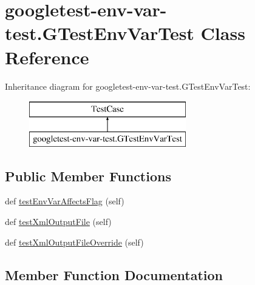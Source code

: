 \hypertarget{classgoogletest-env-var-test_1_1_g_test_env_var_test}{}\section{googletest-\/env-\/var-\/test.G\+Test\+Env\+Var\+Test Class Reference}
\label{classgoogletest-env-var-test_1_1_g_test_env_var_test}
Inheritance diagram for googletest-\/env-\/var-\/test.G\+Test\+Env\+Var\+Test\+:\begin{figure}[H]
\begin{center}
\leavevmode
\includegraphics[height=2.000000cm]{df/de5/classgoogletest-env-var-test_1_1_g_test_env_var_test}
\end{center}
\end{figure}
\subsection*{Public Member Functions}
\begin{DoxyCompactItemize}
\item 
def \mbox{\hyperlink{classgoogletest-env-var-test_1_1_g_test_env_var_test_ae0165e3c30ce525c4d2f653e8f27ed3c}{test\+Env\+Var\+Affects\+Flag}} (self)
\item 
def \mbox{\hyperlink{classgoogletest-env-var-test_1_1_g_test_env_var_test_a6929a9194cdf872c02f6b2f3de9ff499}{test\+Xml\+Output\+File}} (self)
\item 
def \mbox{\hyperlink{classgoogletest-env-var-test_1_1_g_test_env_var_test_acf4114bec10759f9545f16846ce17f6f}{test\+Xml\+Output\+File\+Override}} (self)
\end{DoxyCompactItemize}


\subsection{Member Function Documentation}
\mbox{\label{classgoogletest-env-var-test_1_1_g_test_env_var_test_ae0165e3c30ce525c4d2f653e8f27ed3c}} 
